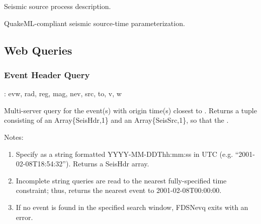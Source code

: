 \documentclass[letterpaper,11pt,english]{sphinxmanual}
\begin{document}
Seismic source process description.

\begin{fulllineitems}
\label{\detokenize{src/Submodules/quake:SourceTime}}
\end{fulllineitems}


QuakeML-compliant seismic source-time parameterization.


\subsection{Web Queries}
\label{\detokenize{src/Submodules/quake:web-queries}}

\subsubsection{Event Header Query}
\label{\detokenize{src/Submodules/quake:event-header-query}}

\begin{fulllineitems}
\end{fulllineitems}


{\hyperref[\detokenize{src/Appendices/keywords:dkw}]{}}: evw, rad, reg, mag, nev, src, to, v, w

Multi-server query for the event(s) with origin time(s) closest to . Returns
a tuple consisting of an Array\{SeisHdr,1\} and an Array\{SeisSrc,1\}, so that
the .

Notes:
\begin{enumerate}
\def\theenumi{\arabic{enumi}}
\def\labelenumi{\theenumi .}
\makeatletter\def\p@enumii{\p@enumi \theenumi .}\makeatother
\item {} 
Specify  as a string formatted YYYY-MM-DDThh:mm:ss in UTC (e.g. “2001-02-08T18:54:32”). Returns a SeisHdr array.

\item {} 
Incomplete string queries are read to the nearest fully-specified time constraint; thus,  returns the nearest event to 2001-02-08T00:00:00.

\item {} 
If no event is found in the specified search window, FDSNevq exits with an error.

\end{enumerate}
\end{document}
